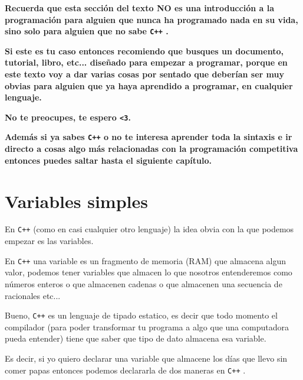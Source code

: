 \documentclass[12pt, fleqn]{report}                             %
\theoremstyle{break}                                            %
\newcommand \Cpp  {\texttt{C++} }                               %
\begin{document}
        \textbf{
            Recuerda que esta sección del texto NO es una introducción a la programación para
            alguien que nunca ha programado nada en su vida, sino solo para alguien que
            no sabe \Cpp. 
        }

        \textbf{
            Si este es tu caso entonces recomiendo que busques un documento, tutorial, libro, etc...
            diseñado para empezar a programar, porque en este texto voy a dar varias cosas por sentado
            que deberían ser muy obvias para alguien que ya haya aprendido a programar, en cualquier
            lenguaje.
        }

        \textbf{
            No te preocupes, te espero \texttt{<3}.
        }
        
        \textbf{
            Además si ya sabes \Cpp o no te interesa aprender toda la sintaxis e ir directo a cosas
            algo más relacionadas con la programación competitiva entonces puedes saltar hasta el
            siguiente capítulo.
        }

        \clearpage
        \section{Variables simples}

            En \Cpp (como en casi cualquier otro lenguaje) la idea obvia con la que podemos empezar
            es las variables.

            En \Cpp una variable es un fragmento de memoria (RAM) que almacena algun valor, 
            podemos tener variables que almacen lo que nosotros entenderemos como números enteros
            o que almacenen cadenas o que almacenen una secuencia de racionales etc...

            Bueno, \Cpp es un lenguaje de tipado estatico, es decir que todo momento el compilador
            (para poder transformar tu programa a algo que una computadora pueda entender) tiene
            que saber que tipo de dato almacena esa variable.

            Es decir, si yo quiero declarar una variable que almacene los días que llevo sin comer
            papas entonces podemos declararla de dos maneras en \Cpp.


\end{document}
